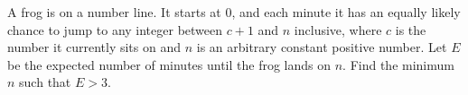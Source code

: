 A frog is on a number line. It starts at $0$, and each minute it has an equally likely chance to jump to any integer between $c + 1$ and $n$ inclusive, where $c$ is the number it currently sits on and $n$ is an arbitrary constant positive number. Let $E$ be the expected number of minutes until the frog lands on $n$. Find the minimum $n$ such that $E > 3$.
